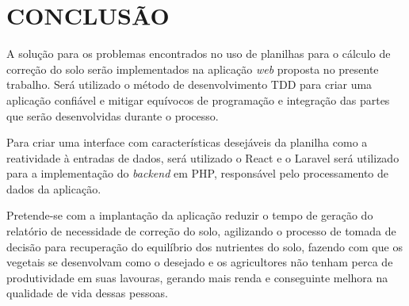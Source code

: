 
\chapter{CONCLUSÃO}
\label{chap:conclusao}

A solução para os problemas encontrados no uso de planilhas para o cálculo de correção do solo serão implementados na aplicação \textit{web} proposta no presente trabalho. Será utilizado o método de desenvolvimento TDD para criar uma aplicação confiável e mitigar equívocos de programação e integração das partes que serão desenvolvidas durante o processo.

Para criar uma interface com características desejáveis da planilha como a reatividade à entradas de dados, será utilizado o React e o Laravel será utilizado para a implementação do \textit{backend} em PHP, responsável pelo processamento de dados da aplicação.

Pretende-se com a implantação da aplicação reduzir o tempo de geração do relatório de necessidade de correção do solo, agilizando o processo de tomada de decisão para recuperação do equilíbrio dos nutrientes do solo, fazendo com que os vegetais se desenvolvam como o desejado e os agricultores não tenham perca de produtividade em suas lavouras, gerando mais renda e conseguinte melhora na qualidade de vida dessas pessoas.



